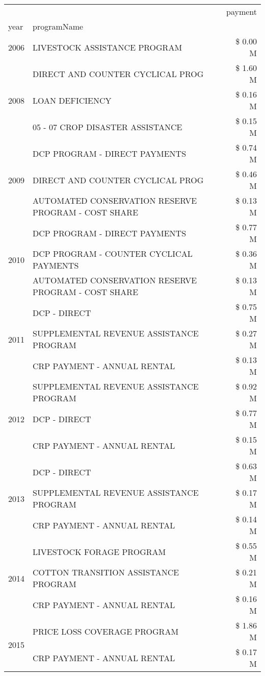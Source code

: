 \begin{tabular}{llr}
\toprule
 &  & payment \\
year & programName &  \\
\midrule
2006 & LIVESTOCK ASSISTANCE PROGRAM & \$ 0.00 M \\
\cline{1-3}
\multirow[t]{3}{*}{2008} & DIRECT AND COUNTER CYCLICAL PROG & \$ 1.60 M \\
 & LOAN DEFICIENCY & \$ 0.16 M \\
 & 05 - 07 CROP DISASTER ASSISTANCE & \$ 0.15 M \\
\cline{1-3}
\multirow[t]{3}{*}{2009} & DCP PROGRAM - DIRECT PAYMENTS & \$ 0.74 M \\
 & DIRECT AND COUNTER CYCLICAL PROG & \$ 0.46 M \\
 & AUTOMATED CONSERVATION RESERVE PROGRAM - COST SHARE & \$ 0.13 M \\
\cline{1-3}
\multirow[t]{3}{*}{2010} & DCP PROGRAM - DIRECT PAYMENTS & \$ 0.77 M \\
 & DCP PROGRAM - COUNTER CYCLICAL PAYMENTS & \$ 0.36 M \\
 & AUTOMATED CONSERVATION RESERVE PROGRAM - COST SHARE & \$ 0.13 M \\
\cline{1-3}
\multirow[t]{3}{*}{2011} & DCP - DIRECT & \$ 0.75 M \\
 & SUPPLEMENTAL REVENUE ASSISTANCE PROGRAM & \$ 0.27 M \\
 & CRP PAYMENT - ANNUAL RENTAL & \$ 0.13 M \\
\cline{1-3}
\multirow[t]{3}{*}{2012} & SUPPLEMENTAL REVENUE ASSISTANCE PROGRAM & \$ 0.92 M \\
 & DCP - DIRECT & \$ 0.77 M \\
 & CRP PAYMENT - ANNUAL RENTAL & \$ 0.15 M \\
\cline{1-3}
\multirow[t]{3}{*}{2013} & DCP - DIRECT & \$ 0.63 M \\
 & SUPPLEMENTAL REVENUE ASSISTANCE PROGRAM & \$ 0.17 M \\
 & CRP PAYMENT - ANNUAL RENTAL & \$ 0.14 M \\
\cline{1-3}
\multirow[t]{3}{*}{2014} & LIVESTOCK FORAGE PROGRAM & \$ 0.55 M \\
 & COTTON TRANSITION ASSISTANCE PROGRAM & \$ 0.21 M \\
 & CRP PAYMENT - ANNUAL RENTAL & \$ 0.16 M \\
\cline{1-3}
\multirow[t]{3}{*}{2015} & PRICE LOSS COVERAGE PROGRAM & \$ 1.86 M \\
 & CRP PAYMENT - ANNUAL RENTAL & \$ 0.17 M \\

\end{tabular}
